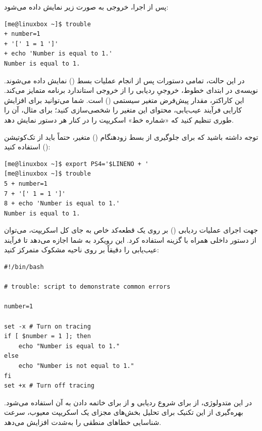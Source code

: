 پس از اجرا، خروجی به صورت زیر نمایش داده می‌شود:

\begin{latin}
\begin{lstlisting}
[me@linuxbox ~]$ trouble
+ number=1
+ '[' 1 = 1 ']'
+ echo 'Number is equal to 1.'
Number is equal to 1.
\end{lstlisting}
\end{latin}

در این حالت، تمامی دستورات پس از انجام عملیات بسط () نمایش داده می‌شوند. نویسه‌ی \cmd{+} در ابتدای خطوط، خروجیِ ردیابی را از خروجی استاندارد برنامه متمایز می‌کند. این کاراکتر، مقدار پیش‌فرض متغیر سیستمی  () است. شما می‌توانید برای افزایش کارایی فرآیند عیب‌یابی، محتوای این متغیر را شخصی‌سازی کنید؛ برای مثال، آن را طوری تنظیم کنید که «شماره خط» اسکریپت را در کنار هر دستور نمایش دهد.

توجه داشته باشید که برای جلوگیری از بسط زودهنگام () متغیر، حتماً باید از تک‌کوتیشن () استفاده کنید:

\begin{latin}
\begin{lstlisting}
[me@linuxbox ~]$ export PS4='$LINENO + '
[me@linuxbox ~]$ trouble
5 + number=1
7 + '[' 1 = 1 ']'
8 + echo 'Number is equal to 1.'
Number is equal to 1.
\end{lstlisting}
\end{latin}

جهت اجرای عملیات ردیابی () بر روی یک قطعه‌کد خاص به جای کل اسکریپت، می‌توان از دستور داخلی  همراه با گزینه  استفاده کرد. این رویکرد به شما اجازه می‌دهد تا فرآیند عیب‌یابی را دقیقاً بر روی ناحیه مشکوک متمرکز کنید:

\begin{latin}
\begin{lstlisting}
#!/bin/bash

# trouble: script to demonstrate common errors

number=1

set -x # Turn on tracing
if [ $number = 1 ]; then
    echo "Number is equal to 1."
else
    echo "Number is not equal to 1."
fi
set +x # Turn off tracing
\end{lstlisting}
\end{latin}

در این متدولوژی، از  برای شروع ردیابی و از  برای خاتمه دادن به آن استفاده می‌شود. بهره‌گیری از این تکنیک برای تحلیل بخش‌های مجزای یک اسکریپت معیوب، سرعت شناسایی خطاهای منطقی را به‌شدت افزایش می‌دهد.

